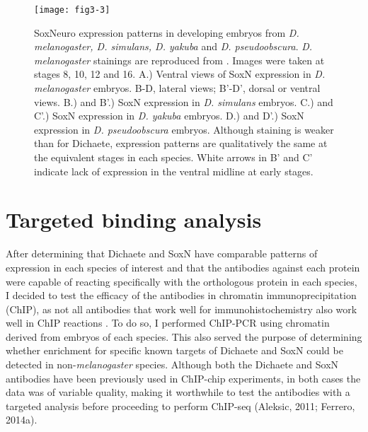 \begin{figure}
\centering
\texttt{[image: fig3-3]}
\caption{SoxNeuro expression patterns in developing embryos from \emph{D. melanogaster, D. simulans, D. yakuba} and \emph{D. pseudoobscura}. \emph{D. melanogaster} stainings are reproduced from \citet{buescher_formation_2002}. Images were taken at stages 8, 10, 12 and 16. A.) Ventral views of SoxN expression in \emph{D. melanogaster} embryos. B-D, lateral views; B’-D’, dorsal or ventral views. B.) and B’.) SoxN expression in \emph{D. simulans} embryos. C.) and C’.) SoxN expression in \emph{D. yakuba} embryos. D.) and D’.) SoxN expression in \emph{D. pseudoobscura} embryos. Although staining is weaker than for Dichaete, expression patterns are qualitatively the same at the equivalent stages in each species. White arrows in B’ and C’ indicate lack of expression in the ventral midline at early stages.}
\label{Figure 3.3}
\end{figure}

\section{Targeted binding analysis}
After determining that Dichaete and SoxN have comparable patterns of expression in each species of interest and that the antibodies against each protein were capable of reacting specifically with the orthologous protein in each species, I decided to test the efficacy of the antibodies in chromatin immunoprecipitation (ChIP), as not all antibodies that work well for immunohistochemistry also work well in ChIP reactions \citep{landt_chip-seq_2012}. To do so, I performed ChIP-PCR using chromatin derived from embryos of each species. This also served the purpose of determining whether enrichment for specific known targets of Dichaete and SoxN could be detected in non-\emph{melanogaster} species. Although both the Dichaete and SoxN antibodies have been previously used in ChIP-chip experiments, in both cases the data was of variable quality, making it worthwhile to test the antibodies with a targeted analysis before proceeding to perform ChIP-seq (Aleksic, 2011; Ferrero, 2014a).\\

